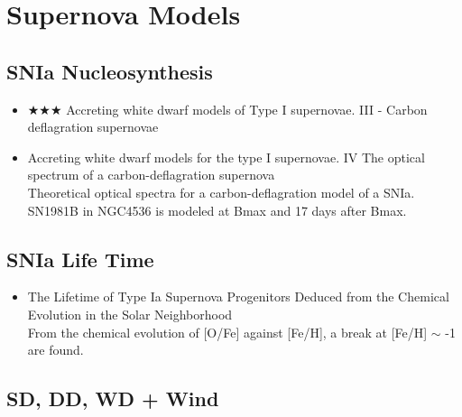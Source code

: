 \chapter{Supernova Models}

\section{SNIa Nucleosynthesis}
\begin{itemize}
\item $\bigstar\bigstar\bigstar$ Accreting white dwarf models of Type I supernovae. III - 
Carbon deflagration supernovae \citep[][\# ]{nomoto84a}
\item Accreting white dwarf models for the type I supernovae. IV 
The optical spectrum of a carbon-deflagration supernova
\citep[][\#117, 5/3/10, branch85a]{branch85a}\\
Theoretical optical spectra for a carbon-deflagration model of a SNIa.
SN1981B in NGC4536 is modeled at Bmax and 17 days after Bmax.
\end{itemize}

\section{SNIa Life Time}
\begin{itemize}
\item The Lifetime of Type Ia Supernova Progenitors Deduced from the Chemical Evolution 
in the Solar Neighborhood
\citep[][\#101, 5/3/10, yoshii96a]{yoshii96a}\\
From the chemical evolution of [O/Fe] against [Fe/H], a break at [Fe/H] $\sim$ -1 are found.
\end{itemize}

\section{SD, DD, WD + Wind}
